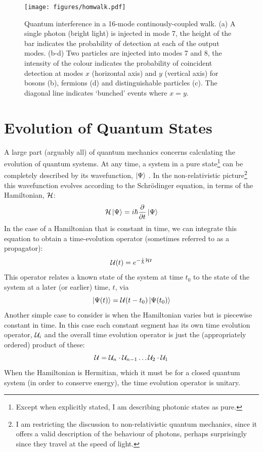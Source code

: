 \begin{figure}
  \centering
  \texttt{[image: figures/homwalk.pdf]}
  \caption[Quantum interference in a continuously-coupled walk]
  {Quantum interference in a 16-mode continously-coupled walk. (a) A single
  photon (bright light) is injected in mode 7, the height of the bar indicates
  the probability of detection at each of the output modes. (b-d) Two particles
  are injected into modes 7 and 8, the intensity of the colour indicates the
  probability of coincident detection at modes \(x\) (horizontal axis) and \(y\)
  (vertical axis) for bosons (b), fermions (d) and distinguishable particles
  (c). The diagonal line indicates `bunched' events where \(x=y\).}
  \label{fig:HoMWalk}
\end{figure}

\section{Evolution of Quantum States}
\label{sec:Evolution}
A large part (arguably all) of quantum mechanics concerns
calculating the evolution of quantum systems. At any time, a system in a pure
state\footnote{Except when explicitly stated, I am describing photonic states as
pure.} can be completely described by
its wavefunction, \(\left|\Psi\right\rangle\) \cite{pbr}. In the non-relativistic
picture\footnote{I am restricting the discussion to non-relativistic quantum
mechanics, since it offers a valid description of the behaviour of photons,
perhaps surprisingly since they travel at the speed of light.} this
wavefunction evolves according to the Schr\"odinger equation, in terms of the
Hamiltonian, \(\mathcal{H}\):
\begin{equation}
  \mathcal{H} \left|\Psi\right\rangle = i \hbar \frac{\partial}{\partial t} \left|\Psi\right\rangle
\end{equation}
In the case of a Hamiltonian that is constant in time, we can integrate this
equation to obtain a time-evolution operator (sometimes referred to as a
propagator):
\begin{equation}
  \label{eq:expiht}
  \mathcal{U} \!\left(t\right) = e^{-\frac{i}{\hbar} \mathcal{H} t}
\end{equation}
This operator relates a known state of the system at time \(t_{0}\) to the state
of the system at a later (or earlier) time, \(t\), via
\begin{equation}
  \left| \Psi \!\left(t\right) \right\rangle = \mathcal{U} \!\left(t-t_{0}\right) \left| \Psi \!\left(t_{0}\right) \right\rangle
\end{equation}
Another simple case to consider is when the Hamiltonian varies but is piecewise
constant in time. In this case each constant segment has its own time evolution
operator, \(\mathcal{U}_{i}\) and  the overall time evolution operator is just the
(appropriately ordered) product of these:
\begin{equation}
  \mathcal{U} = \mathcal{U}_{n} \cdot \mathcal{U}_{n-1} \dots \mathcal{U}_{2} \cdot \mathcal{U}_{1}
\end{equation}
When the Hamiltonian is Hermitian, which it must be for a closed quantum system
(in order to conserve energy), the time evolution operator is unitary.

